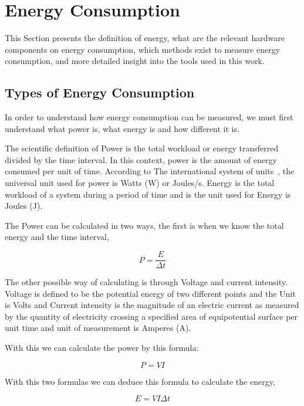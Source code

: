 \section{Energy Consumption}
\label{sc:energyconsumption}

This Section presents the definition of energy, what are the relevant hardware components on energy consumption, which methods exist to measure energy consumption, and more detailed insight into the tools used in this work.

\subsection{Types of Energy Consumption} \label{energypower} 
In order to understand how energy consumption can be measured, we must first understand what power is, what energy is and how different it is.

The scientific definition of Power is the total workload or energy transferred divided by the time interval. In this context, power is the amount of energy consumed per unit of time. According to The international system of units~\cite{taylor_1991}, the universal unit used for power is Watts (W) or Joules/s. Energy is the total workload of a system during a period of time and is the unit used for Energy is Joules (J).

The Power can be calculated in two ways, the first is when we know the total energy and the time interval,

\begin{equation}
P = \frac{E}{\Delta t} 
\end{equation}

The other possible way of calculating is through Voltage and current intensity. Voltage is defined to be the potential energy of two different points and the Unit is Volts and Current intensity is the magnitude of an electric current as measured by the quantity of electricity crossing a specified area of equipotential surface per unit time and unit of measurement is Amperes (A). 

With this we can calculate the power by this formula:

\begin{equation}\label{eq:pvi}
P = V I
\end{equation}

With this two formulas we can deduce this formula to calculate the energy,

\begin{equation}\label{eq:energyfinal}
E = V I \Delta t
\end{equation}

